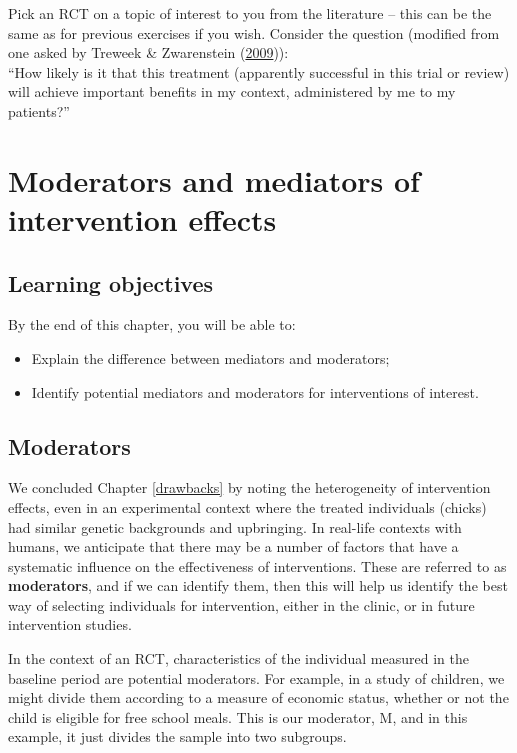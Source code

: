 \documentclass{krantz}
\begin{document}
Pick an RCT on a topic of interest to you from the literature -- this can be the same as for previous exercises if you wish. Consider the question (modified from one asked by Treweek \& Zwarenstein (\protect\hyperlink{ref-treweek2009}{2009})):\\
``How likely is it that this treatment (apparently successful in this trial or review) will achieve important benefits in my context, administered by me to my patients?''

\hypertarget{mediators}{%
\chapter{Moderators and mediators of intervention effects}\label{mediators}}

\hypertarget{learning-objectives-14}{%
\section{Learning objectives}\label{learning-objectives-14}}

By the end of this chapter, you will be able to:

\begin{itemize}
\item
  Explain the difference between mediators and moderators;
\item
  Identify potential mediators and moderators for interventions of interest.
\end{itemize}

\hypertarget{moderators}{%
\section{Moderators}\label{moderators}}

We concluded Chapter \ref{drawbacks} by noting the heterogeneity of intervention effects, even in an experimental context where the treated individuals (chicks) had similar genetic backgrounds and upbringing. In real-life contexts with humans, we anticipate that there may be a number of factors that have a systematic influence on the effectiveness of interventions. These are referred to as \textbf{moderators}, and if we can identify them, then this will help us identify the best way of selecting individuals for intervention, either in the clinic, or in future intervention studies.

In the context of an RCT, characteristics of the individual measured in the baseline period are potential moderators. For example, in a study of children, we might divide them according to a measure of economic status, whether or not the child is eligible for free school meals. This is our moderator, M, and in this example, it just divides the sample into two subgroups.
\end{document}
